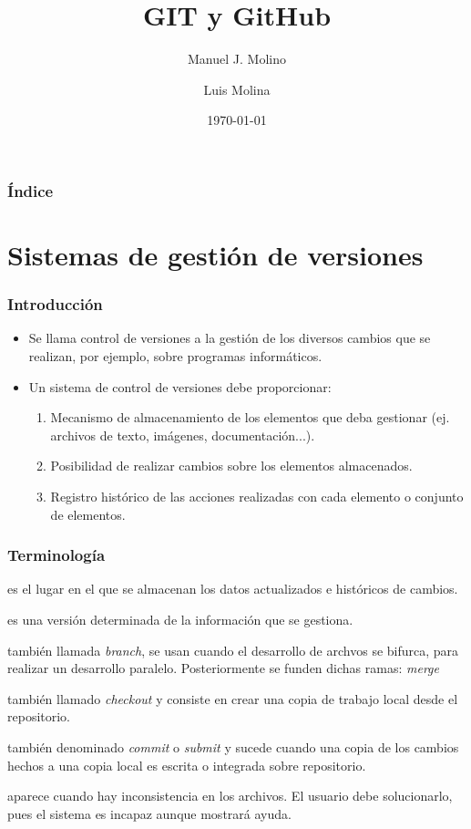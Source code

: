 \documentclass{beamer}
\title{GIT y GitHub}
\author{Manuel J. Molino \and Luis Molina}
\institute{IES Virgen del Carmen \and Departamento de informatica}
\date{\today}
\begin{document}
\begin{frame}
\titlepage %
\end{frame} 

\begin{frame}
\frametitle{Índice}
\tableofcontents
\end{frame} 


\section{Sistemas de gestión de versiones}

\begin{frame}
\frametitle{Introducción}
\begin{itemize}[<+->]
\item Se llama control de versiones a la gestión de los diversos cambios que se realizan, por ejemplo, sobre programas informáticos.
\item Un sistema de control de versiones debe proporcionar:
\begin{enumerate}
\item Mecanismo de almacenamiento de los elementos que deba gestionar (ej. archivos de texto, imágenes, documentación...).
\item Posibilidad de realizar cambios sobre los elementos almacenados.
\item Registro histórico de las acciones realizadas con cada elemento o conjunto de elementos.
\end{enumerate}
\end{itemize} 
\end{frame}


\begin{frame} 
\frametitle{Terminología}
\begin{description}[<+->]
\item[Repositorio]  es el lugar en el que se almacenan los datos actualizados e históricos de cambios.
\item[Version] es una versión determinada de la información que se gestiona.
\item[Rama] también llamada \emph{branch}, se usan cuando el desarrollo de archvos se bifurca, para realizar un desarrollo paralelo. Posteriormente se funden dichas ramas: \emph{merge}
\item[Desplegar] también llamado \emph{checkout} y consiste en crear una copia de trabajo local desde el repositorio. 
\item[Publicar] también denominado \emph{commit} o \emph{submit} y sucede cuando una copia de los cambios hechos a una copia local es escrita o integrada sobre repositorio.
\item[Conflicto] aparece cuando hay inconsistencia en los archivos. El usuario debe solucionarlo, pues el sistema es incapaz aunque mostrará ayuda.
\end{description}
\end{frame}
\end{document}
